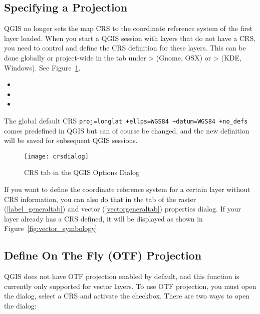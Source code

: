 \subsection{Specifying a Projection}
\label{sec:projection-specifying}

QGIS no longer sets the map CRS to the coordinate reference system of the
first layer loaded. When you start a QGIS session with layers that do not
have a CRS, you need to control and define the CRS definition for these
layers. This can be done globally or project-wide in the  tab under
 >  (Gnome, OSX) 
or  >  (KDE, Windows). 
See Figure~\ref{fig:crsdialog}. 

\begin{itemize}
\item {} 
\item {}
\item {}
\end{itemize}

The global default CRS \texttt{proj=longlat +ellps=WGS84 +datum=WGS84
+no\_defs} comes predefined in QGIS but can of course be changed, and the new
definition will be saved for subsequent QGIS sessions.    

\begin{figure}[ht]
   \begin{center}
   \caption{CRS tab in the QGIS Options Dialog \nixcaption}\label{fig:crsdialog}\smallskip
   \texttt{[image: crsdialog]}
\end{center}
\end{figure}

If you want to define the coordinate reference system for a certain layer
without CRS information, you can also do that in the  tab of the
raster (\ref{label_generaltab}) and vector (\ref{vectorgeneraltab}) properties 
dialog. If your layer already has a CRS defined, it
will be displayed as shown in Figure~\ref{fig:vector_symbology}.

\subsection{Define On The Fly (OTF) Projection}\label{label_projstart}

QGIS does not have OTF projection enabled by default, and this function is
currently only supported for vector layers. To use OTF projection, you must
open the  dialog, select a
CRS and activate the  checkbox.
There are two ways to open the dialog:

